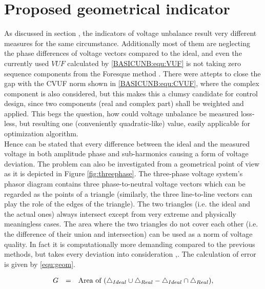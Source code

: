 \section{Proposed geometrical indicator}\label{VUB:sec:Geom}

As discussed in section , the indicators of voltage unbalance result very different measures for the same circumstance. Additionally most of them are neglecting the phase differences of voltage vectors compared to the ideal, and even the currently used $VUF$ calculated by \ref{BASICUNB:equ:VUF} is not taking zero sequence components from the Foresque method \cite{fortescue1918method}. There were attepts to close the gap with the CVUF norm shown in \ref{BASICUNB:equ:CVUF}, where the complex component is also considered, but this makes this a clumsy candidate for control design, since two components (real and complex part) shall be weighted and applied. This begs the question, how could voltage unbalance be measured loss-less, but resulting one (conveniently quadratic-like) value, easily applicable for optimization algorithm. \\
Hence can be stated that every difference between the ideal and the measured voltage in both amplitude phase and sub-harmonics causing a form of voltage deviation. The problem can also be investigated from a geometrical point of view as it is depicted in Figure \ref{fig:threephase}. The three-phase voltage system's phasor diagram contains three  phase-to-neutral voltage vectors which can be regarded as the points of a triangle (similarly, the three line-to-line vectors can play the role of the edges of the triangle). The two triangles (i.e. the ideal and the actual ones) always intersect except from very extreme and physically meaningless cases. The area where the two triangles do not cover each other (i.e. the difference of their union and intersection) can be used as a norm of voltage quality. In fact it is computationally more demanding compared to the previous methods, but takes every deviation into consideration \cite{Neukirchner2015},\cite{neukirchner2015examination}. The calculation of error is given by \ref{equ:geom}.

            \begin{equation}
                \begin{array}{rcl}
                       G&=&\textnormal{Area of }(\bigtriangleup_{Ideal}\cup\bigtriangleup_{Real}-\bigtriangleup_{Ideal}\cap\bigtriangleup_{Real}),
                \end{array}
                \label{equ:geom}
            \end{equation}

